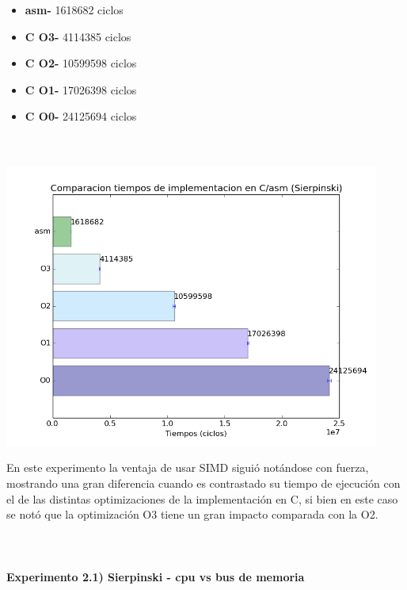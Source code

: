 \documentclass[a4paper]{article}
\begin{document}
\begin{itemize}


\item \textbf{asm-} 1618682 ciclos\\
\item \textbf{C O3-} 4114385  ciclos\\
\item \textbf{C O2-} 10599598 ciclos\\
\item \textbf{C O1-} 17026398 ciclos\\
\item \textbf{C O0-} 24125694 ciclos\\ \\ \\

\end{itemize}

\includegraphics[width=350pt]{imagenes/CompCasm2.png}

En este experimento la ventaja de usar SIMD sigui\'{o} not\'{a}ndose con fuerza, mostrando una gran diferencia cuando es contrastado su tiempo de ejecuci\'{o}n con el de las distintas optimizaciones de la implementaci\'{o}n en C, si bien en este caso se not\'{o} que la optimizaci\'{o}n O3 tiene un gran impacto comparada con la O2. \\ \\ \\ \\

\textbf{Experimento 2.1) Sierpinski - cpu vs bus de memoria}\\ \\
\end{document}
